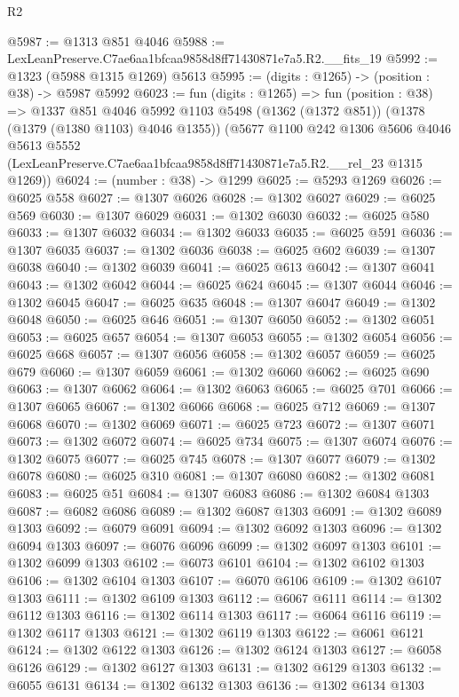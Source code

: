 \begin{lexlean}{R2}
\begin{coremodule}
@5987 := @1313 @851 @4046
@5988 := LexLeanPreserve.C7ae6aa1bfcaa9858d8ff71430871e7a5.R2.__fits_19
@5992 := @1323 (@5988 @1315 @1269) @5613
@5995 := (digits : @1265) -> (position : @38) -> @5987 @5992
@6023 := fun (digits : @1265) =>
  fun (position : @38) =>
  @1337
    @851
    @4046
    @5992
    @1103
    @5498
    (@1362 (@1372 @851))
    (@1378 (@1379 (@1380 @1103) @4046 @1355))
    (@5677
      @1100
      @242
      @1306
      @5606
      @4046
      @5613
      @5552
      (LexLeanPreserve.C7ae6aa1bfcaa9858d8ff71430871e7a5.R2.__rel_23 @1315 @1269))
@6024 := (number : @38) -> @1299
@6025 := @5293 @1269
@6026 := @6025 @558
@6027 := @1307 @6026
@6028 := @1302 @6027
@6029 := @6025 @569
@6030 := @1307 @6029
@6031 := @1302 @6030
@6032 := @6025 @580
@6033 := @1307 @6032
@6034 := @1302 @6033
@6035 := @6025 @591
@6036 := @1307 @6035
@6037 := @1302 @6036
@6038 := @6025 @602
@6039 := @1307 @6038
@6040 := @1302 @6039
@6041 := @6025 @613
@6042 := @1307 @6041
@6043 := @1302 @6042
@6044 := @6025 @624
@6045 := @1307 @6044
@6046 := @1302 @6045
@6047 := @6025 @635
@6048 := @1307 @6047
@6049 := @1302 @6048
@6050 := @6025 @646
@6051 := @1307 @6050
@6052 := @1302 @6051
@6053 := @6025 @657
@6054 := @1307 @6053
@6055 := @1302 @6054
@6056 := @6025 @668
@6057 := @1307 @6056
@6058 := @1302 @6057
@6059 := @6025 @679
@6060 := @1307 @6059
@6061 := @1302 @6060
@6062 := @6025 @690
@6063 := @1307 @6062
@6064 := @1302 @6063
@6065 := @6025 @701
@6066 := @1307 @6065
@6067 := @1302 @6066
@6068 := @6025 @712
@6069 := @1307 @6068
@6070 := @1302 @6069
@6071 := @6025 @723
@6072 := @1307 @6071
@6073 := @1302 @6072
@6074 := @6025 @734
@6075 := @1307 @6074
@6076 := @1302 @6075
@6077 := @6025 @745
@6078 := @1307 @6077
@6079 := @1302 @6078
@6080 := @6025 @310
@6081 := @1307 @6080
@6082 := @1302 @6081
@6083 := @6025 @51
@6084 := @1307 @6083
@6086 := @1302 @6084 @1303
@6087 := @6082 @6086
@6089 := @1302 @6087 @1303
@6091 := @1302 @6089 @1303
@6092 := @6079 @6091
@6094 := @1302 @6092 @1303
@6096 := @1302 @6094 @1303
@6097 := @6076 @6096
@6099 := @1302 @6097 @1303
@6101 := @1302 @6099 @1303
@6102 := @6073 @6101
@6104 := @1302 @6102 @1303
@6106 := @1302 @6104 @1303
@6107 := @6070 @6106
@6109 := @1302 @6107 @1303
@6111 := @1302 @6109 @1303
@6112 := @6067 @6111
@6114 := @1302 @6112 @1303
@6116 := @1302 @6114 @1303
@6117 := @6064 @6116
@6119 := @1302 @6117 @1303
@6121 := @1302 @6119 @1303
@6122 := @6061 @6121
@6124 := @1302 @6122 @1303
@6126 := @1302 @6124 @1303
@6127 := @6058 @6126
@6129 := @1302 @6127 @1303
@6131 := @1302 @6129 @1303
@6132 := @6055 @6131
@6134 := @1302 @6132 @1303
@6136 := @1302 @6134 @1303

\end{coremodule}
\end{lexlean}
